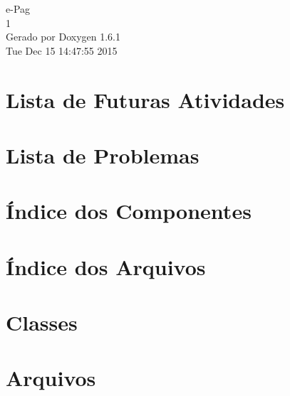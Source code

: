 \documentclass[a4paper]{book}
\begin{document}
\hypersetup{pageanchor=false}
\begin{titlepage}
\vspace*{7cm}
\begin{center}
{\Large e-\/Pag \\[1ex]\large 1 }\\
\vspace*{1cm}
{\large Gerado por Doxygen 1.6.1}\\
\vspace*{0.5cm}
{\small Tue Dec 15 14:47:55 2015}\\
\end{center}
\end{titlepage}
\clearemptydoublepage
{}
\tableofcontents
\clearemptydoublepage
{}
\hypersetup{pageanchor=true}
\chapter{Lista de Futuras Atividades}
\label{todo}
\hypertarget{todo}{}

\chapter{Lista de Problemas}
\label{bug}
\hypertarget{bug}{}

\chapter{Índice dos Componentes}

\chapter{Índice dos Arquivos}

\chapter{Classes}






\chapter{Arquivos}

\printindex
\end{document}
